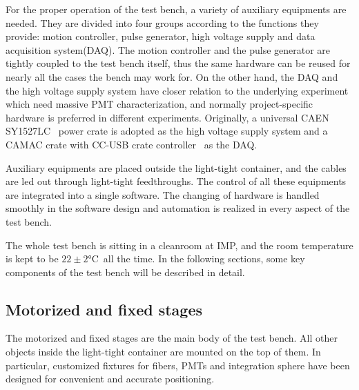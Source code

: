 \documentclass[a4paper,10pt,twoside]{cpc-hepnp}
\begin{document}
\begin{CJK*}{UTF8}{gbsn}
\begin{multicols}{2}
For the proper operation of the test bench, a variety of auxiliary equipments are needed. 
They are divided into four groups according to the functions they provide: motion controller, pulse generator, high voltage supply and data acquisition system(DAQ).
The motion controller and the pulse generator are tightly coupled to the test bench itself, thus the same hardware can be reused for nearly all the cases the bench may work for.
On the other hand, the DAQ and the high voltage supply system have closer relation to the underlying experiment which need massive PMT characterization, and normally project-specific hardware is preferred in different experiments. 
Originally, a universal CAEN SY1527LC~\citep{sy1527lc} power crate is adopted as the high voltage supply system and a CAMAC crate with CC-USB crate controller~\citep{cc_usb} as the DAQ.

Auxiliary equipments are placed outside the light-tight container, and the cables are led out through light-tight feedthroughs.
The control of all these equipments are integrated into a single software. The changing of hardware is handled smoothly in the software design and automation is realized in every aspect of the test bench.

The whole test bench is sitting in a cleanroom at IMP, and the room temperature is kept to be $22\pm2$\si{\celsius}~all the time. 
In the following sections, some key components of the test bench will be described in detail.

\subsection{Motorized and fixed stages}
\label{sec:stages}

The motorized and fixed stages are the main body of the test bench.
All other objects inside the light-tight container are mounted on the top of them.
In particular, customized fixtures for fibers, PMTs and integration sphere have been designed for convenient and accurate positioning.


\end{multicols}
\end{CJK*}
\end{document}
